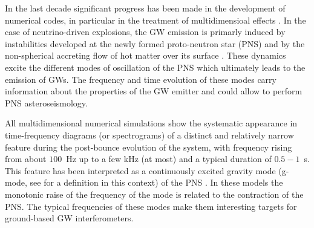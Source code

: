 In the last decade significant progress has been made in the development of numerical codes, {in particular in the treatment of multidimensioal effects \citep{BMueller:2020}.} In the case of  neutrino-driven explosions, the GW emission is {primarly induced by instabilities developed at the newly formed proto-neutron star (PNS) and by the non-spherical accreting flow of hot matter over its surface \citep{Kotake:2017}.  These} dynamics excite the different modes of oscillation of the PNS which ultimately leads to the emission of GWs. The frequency and time evolution of these modes carry information about the properties of the GW emitter and could allow to perform PNS asteroseismology. 



All multidimensional numerical simulations show the systematic appearance in time-frequency diagrams (or spectrograms) of a distinct and relatively narrow feature 
%
%
during the post-bounce evolution of the system, with frequency rising 
from about $100$~Hz up to a few kHz (at most) and a typical duration of $0.5-1$~s. This feature has been interpreted as a continuously excited gravity mode (g-mode, see \citep{kokkotas,Friedman:2013} for a definition in this context) of the PNS \citep{murphy:09, mueller:13gw, Cerda:2013, Yakunin:2015, Kuroda:2016, Andresen:2017}. 
In these models the monotonic raise of the frequency of the mode is related to the contraction of the PNS. The {typical} frequencies of {these} modes make them interesting targets for
ground-based GW interferometers. 
 
